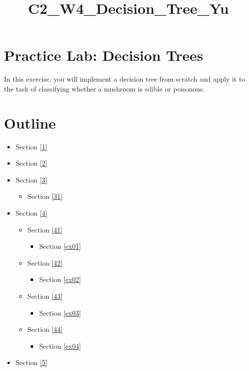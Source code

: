 \documentclass[11pt]{article}
\title{C2\_W4\_Decision\_Tree\_Yu}
\providecommand{\tightlist}{%
      \setlength{\itemsep}{0pt}\setlength{\parskip}{0pt}}
\begin{document}
    
    \maketitle
    
    

    
    \hypertarget{practice-lab-decision-trees}{%
\section{Practice Lab: Decision
Trees}\label{practice-lab-decision-trees}}

In this exercise, you will implement a decision tree from scratch and
apply it to the task of classifying whether a mushroom is edible or
poisonous.

\hypertarget{outline}{%
\section{Outline}\label{outline}}

\begin{itemize}
\tightlist
\item
  Section \ref{1}
\item
  Section \ref{2}
\item
  Section \ref{3}

  \begin{itemize}
  \tightlist
  \item
    Section \ref{31}
  \end{itemize}
\item
  Section \ref{4}

  \begin{itemize}
  \tightlist
  \item
    Section \ref{41}

    \begin{itemize}
    \tightlist
    \item
      Section \ref{ex01}
    \end{itemize}
  \item
    Section \ref{42}

    \begin{itemize}
    \tightlist
    \item
      Section \ref{ex02}
    \end{itemize}
  \item
    Section \ref{43}

    \begin{itemize}
    \tightlist
    \item
      Section \ref{ex03}
    \end{itemize}
  \item
    Section \ref{44}

    \begin{itemize}
    \tightlist
    \item
      Section \ref{ex04}
    \end{itemize}
  \end{itemize}
\item
  Section \ref{5}
\end{itemize}
\end{document}
